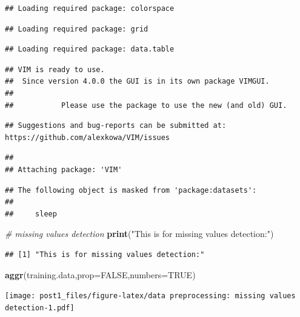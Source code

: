 \documentclass[]{article}
\newenvironment{Shaded}{\begin{snugshade}}{\end{snugshade}}
\newcommand{\KeywordTok}[1]{\textcolor[rgb]{0.13,0.29,0.53}{\textbf{#1}}}
\newcommand{\DataTypeTok}[1]{\textcolor[rgb]{0.13,0.29,0.53}{#1}}
\newcommand{\StringTok}[1]{\textcolor[rgb]{0.31,0.60,0.02}{#1}}
\newcommand{\CommentTok}[1]{\textcolor[rgb]{0.56,0.35,0.01}{\textit{#1}}}
\newcommand{\OtherTok}[1]{\textcolor[rgb]{0.56,0.35,0.01}{#1}}
\newcommand{\NormalTok}[1]{#1}
\begin{document}
\begin{verbatim}
## Loading required package: colorspace
\end{verbatim}

\begin{verbatim}
## Loading required package: grid
\end{verbatim}

\begin{verbatim}
## Loading required package: data.table
\end{verbatim}

\begin{verbatim}
## VIM is ready to use. 
##  Since version 4.0.0 the GUI is in its own package VIMGUI.
## 
##           Please use the package to use the new (and old) GUI.
\end{verbatim}

\begin{verbatim}
## Suggestions and bug-reports can be submitted at: https://github.com/alexkowa/VIM/issues
\end{verbatim}

\begin{verbatim}
## 
## Attaching package: 'VIM'
\end{verbatim}

\begin{verbatim}
## The following object is masked from 'package:datasets':
## 
##     sleep
\end{verbatim}

\begin{Shaded}
\begin{Highlighting}[]
\CommentTok{# missing values detection }
\KeywordTok{print}\NormalTok{(}\StringTok{"This is for missing values detection:"}\NormalTok{)}
\end{Highlighting}
\end{Shaded}

\begin{verbatim}
## [1] "This is for missing values detection:"
\end{verbatim}

\begin{Shaded}
\begin{Highlighting}[]
\KeywordTok{aggr}\NormalTok{(training.data,}\DataTypeTok{prop=}\OtherTok{FALSE}\NormalTok{,}\DataTypeTok{numbers=}\OtherTok{TRUE}\NormalTok{)}
\end{Highlighting}
\end{Shaded}

\texttt{[image: post1\_files/figure-latex/data preprocessing: missing values detection-1.pdf]}
\end{document}
